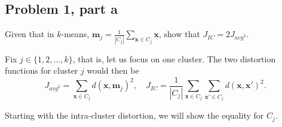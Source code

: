 \subsection{Problem 1, part a}
Given that in $k$-means, $\textbf{m}_j = \frac{1}{|C_j|}\sum_{\textbf{x} \in C_j} \textbf{x}$, show that $J_{IC} = 2J_{avg^2}$.
\partbreak
\begin{solution}

    Fix $j \in \{1, 2, ..., k\}$, that is, let us focus on one cluster. The two distortion functions for cluster $j$ would then be 
    \[J_{avg^2} = \sum_{\textbf{x} \in C_j}d(\textbf{x}, \textbf{m}_j)^2, \quad J_{IC} = \frac{1}{|C_j|} \sum_{\textbf{x} \in C_j}\sum_{\textbf{x}' \in C_j} d(\textbf{x}, \textbf{x}')^2.\]

    Starting with the intra-cluster distortion, we will show the equality for $C_j$.


\end{solution}
